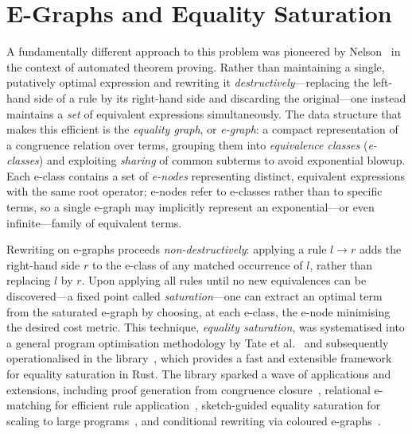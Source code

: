 \section*{E-Graphs and Equality Saturation}

A fundamentally different approach to this problem was pioneered by Nelson~\cite{nelson1980techniques} in the context of automated theorem proving.
Rather than maintaining a single, putatively optimal expression and rewriting it \emph{destructively}---replacing the left-hand side of a rule by its right-hand side and discarding the original---one instead maintains a \emph{set} of equivalent expressions simultaneously.
The data structure that makes this efficient is the \emph{equality graph}, or \emph{e-graph}: a compact representation of a congruence relation over terms, grouping them into \emph{equivalence classes} (\emph{e-classes}) and exploiting \emph{sharing} of common subterms to avoid exponential blowup.
Each e-class contains a set of \emph{e-nodes} representing distinct, equivalent expressions with the same root operator; e-nodes refer to e-classes rather than to specific terms, so a single e-graph may implicitly represent an exponential---or even infinite---family of equivalent terms.

Rewriting on e-graphs proceeds \emph{non-destructively}: applying a rule $l \to r$ adds the right-hand side $r$ to the e-class of any matched occurrence of $l$, rather than replacing $l$ by $r$.
Upon applying all rules until no new equivalences can be discovered---a fixed point called \emph{saturation}---one can extract an optimal term from the saturated e-graph by choosing, at each e-class, the e-node minimising the desired cost metric.
This technique, \emph{equality saturation}, was systematised into a general program optimisation methodology by Tate et al.~\cite{EqualitySaturation2009} and subsequently operationalised in the \egg library~\cite{EggPaper}, which provides a fast and extensible framework for equality saturation in Rust.
The \egg library sparked a wave of applications and extensions, including proof generation from congruence closure~\cite{flatt_small_2022}, relational e-matching for efficient rule application~\cite{zhang_relational_2022}, sketch-guided equality saturation for scaling to large programs~\cite{koehler2022sketchguided}, and conditional rewriting via coloured e-graphs~\cite{singher2023colored}.

